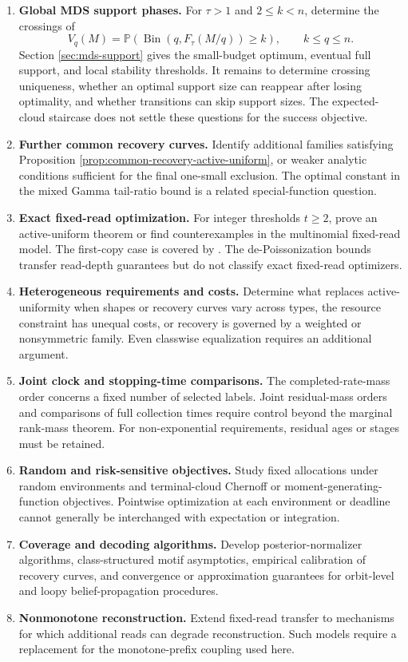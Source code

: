 \documentclass[11pt]{article}
\theoremstyle{definition}
\theoremstyle{remark}
\DeclareMathOperator{\Bin}{Bin}
\newcommand{\Pbb}{\mathbb P}
\newcommand{\1}{\mathbf 1}
\begin{document}
\begin{enumerate}[label=(\arabic*)]
 \item \textbf{Global MDS support phases.} For \(\tau>1\) and \(2\le k<n\), determine the crossings of
 \[
  V_q(M)=\Pbb\!\left(\Bin(q,F_\tau(M/q))\ge k\right),
  \qquad k\le q\le n.
 \]
 Section \ref{sec:mds-support} gives the small-budget optimum, eventual full support, and local stability thresholds. It remains to determine crossing uniqueness, whether an optimal support size can reappear after losing optimality, and whether transitions can skip support sizes. The expected-cloud staircase does not settle these questions for the success objective.
 \item \textbf{Further common recovery curves.} Identify additional families satisfying Proposition \ref{prop:common-recovery-active-uniform}, or weaker analytic conditions sufficient for the final one-small exclusion. The optimal constant in the mixed Gamma tail-ratio bound is a related special-function question.
 \item \textbf{Exact fixed-read optimization.} For integer thresholds \(t\ge2\), prove an active-uniform theorem or find counterexamples in the multinomial fixed-read model. The first-copy case is covered by \cite{Anceaume2015}. The de-Poissonization bounds transfer read-depth guarantees but do not classify exact fixed-read optimizers.
 \item \textbf{Heterogeneous requirements and costs.} Determine what replaces active-uniformity when shapes or recovery curves vary across types, the resource constraint has unequal costs, or recovery is governed by a weighted or nonsymmetric family. Even classwise equalization requires an additional argument.
 \item \textbf{Joint clock and stopping-time comparisons.} The completed-rate-mass order concerns a fixed number of selected labels. Joint residual-mass orders and comparisons of full collection times require control beyond the marginal rank-mass theorem. For non-exponential requirements, residual ages or stages must be retained.
 \item \textbf{Random and risk-sensitive objectives.} Study fixed allocations under random environments and terminal-cloud Chernoff or moment-generating-function objectives. Pointwise optimization at each environment or deadline cannot generally be interchanged with expectation or integration.
 \item \textbf{Coverage and decoding algorithms.} Develop posterior-normalizer algorithms, class-structured motif asymptotics, empirical calibration of recovery curves, and convergence or approximation guarantees for orbit-level and loopy belief-propagation procedures.
 \item \textbf{Nonmonotone reconstruction.} Extend fixed-read transfer to mechanisms for which additional reads can degrade reconstruction. Such models require a replacement for the monotone-prefix coupling used here.
\end{enumerate}
\end{document}

